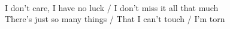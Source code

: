 \\
I don't care, I have no luck / I don't miss it all that much \\
There's just so many things / That I can't touch / I'm torn
